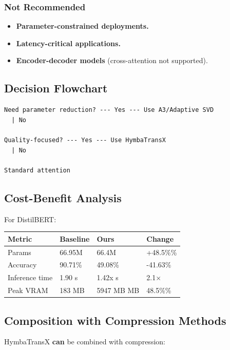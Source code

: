 \subsubsection{Not Recommended}
\begin{itemize}
\item \textbf{Parameter-constrained deployments.}
\item \textbf{Latency-critical applications.}
\item \textbf{Encoder-decoder models} (cross-attention not supported).

\end{itemize}
\subsection{Decision Flowchart}

\begin{lstlisting}
Need parameter reduction? --- Yes --- Use A3/Adaptive SVD
  | No
   
Quality-focused? --- Yes --- Use HymbaTransX
  | No
   
Standard attention
\end{lstlisting}

\subsection{Cost-Benefit Analysis}

For DistilBERT:

\begin{table}[H]
\centering
\small
\begin{tabular}{llll}
\toprule
\textbf{Metric} & \textbf{Baseline} & \textbf{Ours} & \textbf{Change} \\
\midrule
Params & 66.95M & 66.4M & +48.5\%\% \\
Accuracy & 90.71\% & 49.08\% & -41.63\% \\
Inference time & 1.90 s & 1.42x s & 2.1$\times$ \\
Peak VRAM & 183 MB & 5947 MB MB & 48.5\%\% \\
\bottomrule
\end{tabular}
\end{table}

\subsection{Composition with Compression Methods}

HymbaTransX \textbf{can} be combined with compression:

